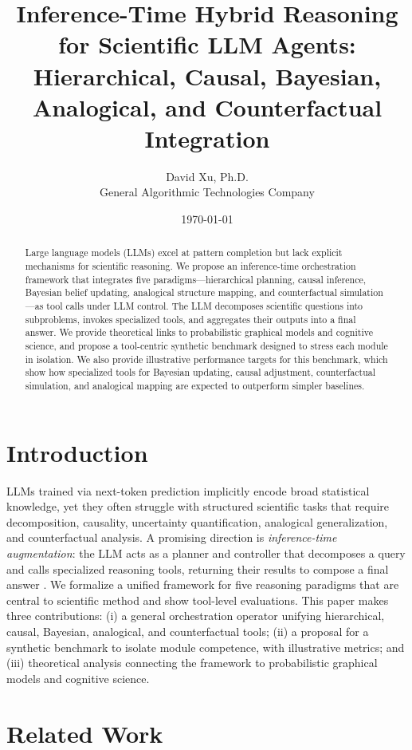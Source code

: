 \documentclass[11pt]{article}
\title{Inference-Time Hybrid Reasoning for Scientific LLM Agents:\\
Hierarchical, Causal, Bayesian, Analogical, and Counterfactual Integration}
\author{David Xu, Ph.D.\\ General Algorithmic Technologies Company}
\date{\today}
\begin{document}
\maketitle

\begin{abstract}
Large language models (LLMs) excel at pattern completion but lack explicit mechanisms for scientific reasoning. We propose an inference-time orchestration framework that integrates five paradigms---hierarchical planning, causal inference, Bayesian belief updating, analogical structure mapping, and counterfactual simulation---as tool calls under LLM control. The LLM decomposes scientific questions into subproblems, invokes specialized tools, and aggregates their outputs into a final answer. We provide theoretical links to probabilistic graphical models and cognitive science, and propose a tool-centric synthetic benchmark designed to stress each module in isolation. We also provide illustrative performance targets for this benchmark, which show how specialized tools for Bayesian updating, causal adjustment, counterfactual simulation, and analogical mapping are expected to outperform simpler baselines.
\end{abstract}

\section{Introduction}
LLMs trained via next-token prediction implicitly encode broad statistical knowledge, yet they often struggle with structured scientific tasks that require decomposition, causality, uncertainty quantification, analogical generalization, and counterfactual analysis. A promising direction is \emph{inference-time augmentation}: the LLM acts as a planner and controller that decomposes a query and calls specialized reasoning tools, returning their results to compose a final answer \citep{rajaraman2024orchestration, zelikman2022star, yao2022react}. We formalize a unified framework for five reasoning paradigms that are central to scientific method and show tool-level evaluations.
This paper makes three contributions: (i) a general orchestration operator unifying hierarchical, causal, Bayesian, analogical, and counterfactual tools; (ii) a proposal for a synthetic benchmark to isolate module competence, with illustrative metrics; and (iii) theoretical analysis connecting the framework to probabilistic graphical models and cognitive science.

\section{Related Work}
\end{document}
